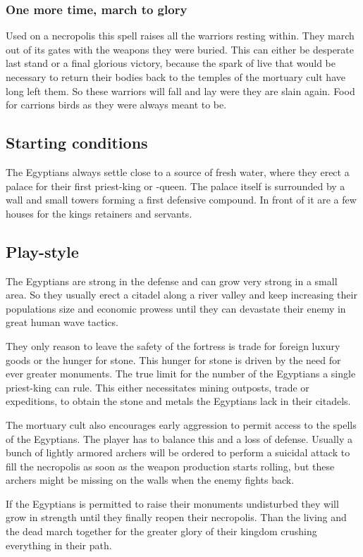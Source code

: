 \subsubsection{One more time, march to glory}
Used on a necropolis this spell raises all the warriors resting within. They
march out of its gates with the weapons they were buried. This can either be
desperate last stand or a final glorious victory, because the spark of live
that would be necessary to return their bodies back to the temples of the
mortuary cult have long left them. So these warriors will fall and lay were
they are slain again. Food for carrions birds as they were always meant to be.

\subsection{Starting conditions}
The \gls{Egyptians} always settle close to a source of fresh water, where they
erect a palace for their first priest-king or -queen. The palace itself is
surrounded by a wall and small towers forming a first defensive compound. In
front of it are a few houses for the kings retainers and servants.

\subsection{Play-style}
The \gls{Egyptians} are strong in the defense and can grow very strong in a
small area. So they usually erect a citadel along a river valley and keep
increasing their populations size and economic prowess until they can devastate
their enemy in great human wave tactics.

They only reason to leave the safety of the fortress is trade for foreign
luxury goods or the hunger for stone. This hunger for stone is driven by the
need for ever greater monuments. The true limit for the number of the
\gls{Egyptians} a single priest-king can rule. This either necessitates mining
outposts, trade or expeditions, to obtain the stone and metals the
\gls{Egyptians} lack in their citadels.

The mortuary cult also encourages early aggression to permit access to the
spells of the \gls{Egyptians}. The player has to balance this and a loss of
defense. Usually a bunch of lightly armored archers will be ordered to perform
a suicidal attack to fill the necropolis as soon as the weapon production
starts rolling, but these archers might be missing on the walls when the enemy
fights back.

If the \gls{Egyptians} is permitted to raise their monuments undisturbed they
will grow in strength until they finally reopen their necropolis. Than the
living and the dead march together for the greater glory of their kingdom
crushing everything in their path.
